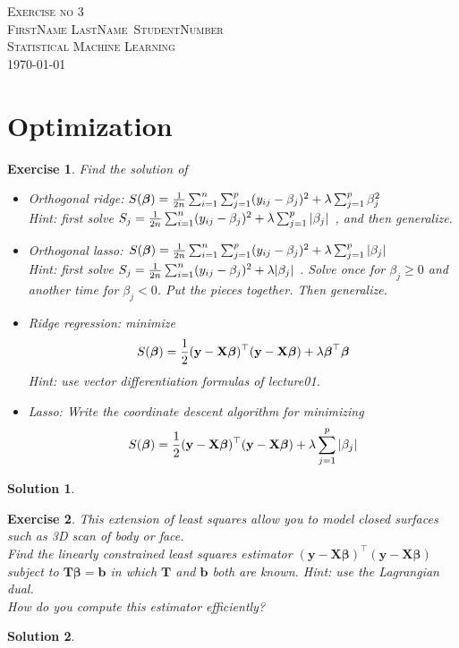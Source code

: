 \documentclass[12pt,a4paper]{article}
\def\StudentName{FirstName LastName}
\def\StudentMatricule{StudentNumber}
\def\ExerciseNo{3}
\def \y {\mathbf y}
\def \X {\mathbf X}
\def \t {^\top}
\def \bbeta {\boldsymbol \beta}
\def \sumi {\sum_{i=1}^n}
\def \sumj {\sum_{j=1}^p}
\newtheorem{exercise}{Exercise}
\numberwithin{exercise}{section} %
\newtheorem{solution}{Solution}
\numberwithin{solution}{section} %
\begin{document}
\begin{titlepage}
\begin{center}
\textsc{\LARGE Exercise no \ExerciseNo}\\[1.5cm]
\vspace{2in}
\textsc{\Large \StudentName~\StudentMatricule}\\[0.5cm]
\textsc{Statistical Machine Learning}\\[0.5cm]
\today
\end{center}
\end{titlepage}



\section{Optimization}
\begin{exercise}
Find the solution of 
\begin{itemize}
\item Orthogonal ridge: $S(\bbeta) = {1\over 2n} \sumi \sumj (y_{ij}-\beta_j)^2 + {\lambda} \sumj \beta_j^2 $ \\
Hint: first solve $S_j= {1\over 2n} \sumi (y_{ij}-\beta_j)^2 + {\lambda} \sumj | \beta_j |$ , and then generalize. 

\item Orthogonal lasso: $S(\bbeta) = {1\over 2n} \sumi \sumj (y_{ij}-\beta_j)^2 + {\lambda } \sumj | \beta_j | $ \\
Hint: first solve $S_j= {1\over 2n} \sumi (y_{ij}-\beta_j)^2 + {\lambda } | \beta_j |$ . Solve once for $\beta_j \geq0$ and another time for $\beta_j <0$. Put the pieces together. Then generalize. 

\item Ridge regression: minimize
$$S(\bbeta) = {1\over 2} (\y - \X\bbeta)\t (\y-\X\bbeta) + {\lambda} \bbeta\t\bbeta$$
Hint: use vector differentiation formulas of lecture01.
\item Lasso: Write the coordinate descent algorithm for minimizing
$$S(\bbeta) = {1\over 2} (\y - \X\bbeta)\t (\y-\X\bbeta) + {\lambda} \sumj |\beta_j|$$

\end{itemize}
\end{exercise}
\begin{solution}
\end{solution}

\newpage

\begin{exercise}
This extension of least squares allow you to model closed surfaces such as 3D scan of body or face.  \\

Find the linearly constrained least squares estimator $(\y - \X\bbeta)\t(\y-\X\bbeta)$ subject to 
$\mathbf T\bbeta=\mathbf b$ in which $\mathbf T$ and $\mathbf b$ both are known. Hint: use the Lagrangian dual. \\
How do you compute this estimator efficiently? 
\end{exercise}
\begin{solution}
\end{solution}
\end{document}
